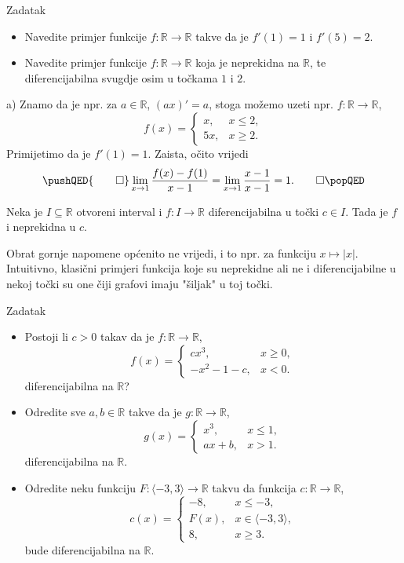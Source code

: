 \begin{exercise}{Zadatak} \textbf{}
\begin{itemize}
\item[a)] Navedite primjer funkcije \(f : \mathbb{R}\to \mathbb{R}\) takve da je \(f'(1)=1\) i \(f'(5)=2\).
\item[b)] Navedite primjer funkcije \(f : \mathbb{R}\to \mathbb{R}\) koja je neprekidna na \(\mathbb{R}\), te diferencijabilna svugdje osim u točkama \(1\) i \(2\).
\end{itemize}
\end{exercise}
\begin{proof*}
a) Znamo da je npr. za \(a\in \mathbb{R}\), \(\left(ax\right)'=a\), stoga možemo uzeti npr. \(f : \mathbb{R}\to \mathbb{R}\),
\[f(x)=\begin{cases}
x, & x\leq 2,\\
5x, & x\geq 2.
\end{cases}\]
Primijetimo da je \(f'(1)=1\). Zaista, očito vrijedi
\[
\pushQED{\qed}
\lim\limits_{x\to 1}{\dfrac{f(x)-f(1)}{x-1}}=\lim\limits_{x\to 1}{\dfrac{x-1}{x-1}}=1.\qedhere
\popQED
\]
\end{proof*}
\begin{remark}
Neka je \(I\subseteq \mathbb{R}\) otvoreni interval i \(f : I \to \mathbb{R}\) diferencijabilna u točki \(c\in I\). Tada je \(f\) i neprekidna u \(c\).
\end{remark}
Obrat gornje napomene općenito ne vrijedi, i to npr. za funkciju \(x\mapsto |x|\). Intuitivno, klasični primjeri funkcija koje su neprekidne ali ne i diferencijabilne u nekoj točki su one čiji grafovi imaju "šiljak" u toj točki.
\begin{exercise}{Zadatak} \textbf{}
\label{idkhowtonamethis}
\begin{itemize}
\item[a)] Postoji li \(c>0\) takav da je \(f : \mathbb{R}\to \mathbb{R}\),
\[f(x)=\begin{cases}
cx^3,& x\geq 0,\\
-x^2-1-c,& x<0.
\end{cases}\]
diferencijabilna na \(\mathbb{R}\)?
\item[b)] Odredite sve \(a, b\in \mathbb{R}\) takve da je \(g : \mathbb{R}\to \mathbb{R}\),
\[g(x)=\begin{cases}
x^3,& x\leq 1,\\
ax+b,& x>1.
\end{cases}\]
diferencijabilna na \(\mathbb{R}\).
\item[c)] Odredite neku funkciju \(F : \langle -3, 3\rangle\to \mathbb{R}\) takvu da funkcija \(c:\mathbb{R}\to \mathbb{R}\),
\[c(x)=\begin{cases}
-8,& x\leq -3,\\
F(x),& x\in \langle -3, 3\rangle,\\
8,& x\geq 3.
\end{cases}\]
bude diferencijabilna na \(\mathbb{R}\).
\end{itemize}
\end{exercise}
